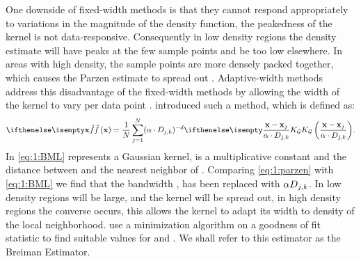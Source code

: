 	One downside of fixed-width methods is that they cannot respond appropriately to variations in the magnitude of the density function, \ie the peakedness of the kernel is not data-responsive. Consequently in low density regions the density estimate will have peaks at the few sample points and be too low elsewhere. In areas with high density, the sample points are more densely packed together, which causes the Parzen estimate to spread out \cite{breiman1977variable}. Adaptive-width methods address this disadvantage of the fixed-width methods by allowing the width of the kernel to vary per data point \varPattern[j]. \citeauthor{breiman1977variable} introduced such a method, which is defined as:
	\begin{equation}\label{eq:1:BML}
	 	\varEstimatedDensityFunction{\varPattern} = \frac{1}{\varNumPatterns} \sum_{j = 1}^{\varNumPatterns} (\varBMLconstant \cdot \varKNNDistance{j}{k})^{-\varDim} \varKernel[\varGaussian]{\frac{\varPattern - \varPattern[j]}{\varBMLconstant \cdot \varKNNDistance{j}{k}}}.
	\end{equation} 
	In \cref{eq:1:BML} \varKernel[\varGaussian]{} represents a Gaussian kernel, \varBMLconstant is a multiplicative constant and  the distance between \varPattern[j] and the \KNNK nearest neighbor of \varPattern[j]. Comparing \cref{eq:1:parzen} with \eqref{eq:1:BML} we find that the bandwidth \varBandwidth, has been replaced with $\alpha D_{j, k}$.  In low density regions  will be large, and the kernel will be spread out, in high density regions the converse occurs, this allows the kernel to adapt its width to density of the local neighborhood. \citeauthor{breiman1977variable} use a minimization algorithm on a goodness of fit statistic to find suitable values for \KNNK and \varBMLconstant. We shall refer to this estimator as the Breiman Estimator. 


